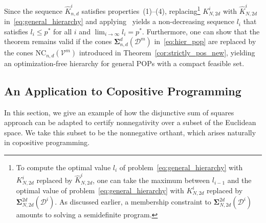 \documentclass[12pt]{article}
\newcommand{\DiSOS}{\mathbf{\Sigma}}
\newcommand{\DiSOSL}{\text{NC}}
\newcommand{\mcD}{\mathcal{D}}
\newcommand{\mcV}{\mathcal{V}}
\theoremstyle{remark}
\newtheorem{remark}{Remark}%
\begin{document}
Since the sequence $\widehat{K}_{n,d}^i$ satisfies properties~(1)--(4), replacing\footnote{
To compute the optimal value $l_i$ of problem~\eqref{eq:general_hierarchy} with $K_{N,2d}^i$ replaced by $\widehat{K}_{N,2d}^i$, one can take the maximum between $l_{i-1}$ and the optimal value of problem~\eqref{eq:general_hierarchy} with $K_{N,2d}^i$ replaced by $\DiSOS^{2d}_{N,2d}(\mcD^i)$. As discussed earlier, a membership constraint to $\DiSOS^{2d}_{N,2d}(\mcD^i)$ amounts to solving a semidefinite program.
} $K_{N,2d}^i$ with $\widehat{K}_{N,2d}^i$ in~\eqref{eq:general_hierarchy} and applying~\cite[Theorem 2.4]{aaa2019} yields a non-decreasing sequence $l_i$ that satisfies 
$l_i\le p^*$ for all $i$ and $\lim_{i\to\infty} l_i=p^*$. 
Furthermore, one can show that 
 the theorem remains valid if the cones $\DiSOS_{n,d}^d(\mcD^m)$ in~\eqref{eq:hier_pop} are replaced by the cones $\DiSOSL_{n,d}(\mcV^m)$ introduced in Theorem~\ref{cor:strictly_pos_new}, yielding an optimization-free hierarchy for general POPs with a compact feasible set.

\subsection{An Application to Copositive Programming}\label{sec:copositive}
In this section, we give an example of how the disjunctive sum of squares approach can be adapted to certify nonnegativity over a subset of the Euclidean space. We take this subset to be the nonnegative orthant, which arises naturally in copositive programming.
\end{document}
